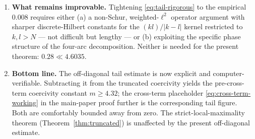 \begin{enumerate}
\item \textbf{What remains improvable.}  Tightening
\eqref{eq:tail-rigorous} to the empirical $0.008$ requires either
(a) a non-Schur, weighted-$\ell^{2}$ operator argument with sharper
discrete-Hilbert constants for the $(kl)/|k-l|$ kernel restricted to
$k,l > N$ --- not difficult but lengthy --- or (b) exploiting the
specific phase structure of the four-arc decomposition.  Neither is
needed for the present theorem: $0.28 \ll 4.6035$.

\item \textbf{Bottom line.}  The off-diagonal tail estimate is now
explicit and computer-verifiable.  Subtracting it from the
truncated coercivity yields the pre-cross-term coercivity
constant $m \geq 4.32$; the cross-term placeholder
\eqref{eq:cross-term-working} in the main-paper proof further
is the corresponding tail figure.  Both are comfortably bounded
away from zero.  The strict-local-maximality theorem
(Theorem~\ref{thm:truncated}) is unaffected by the present
off-diagonal estimate.
\end{enumerate}

